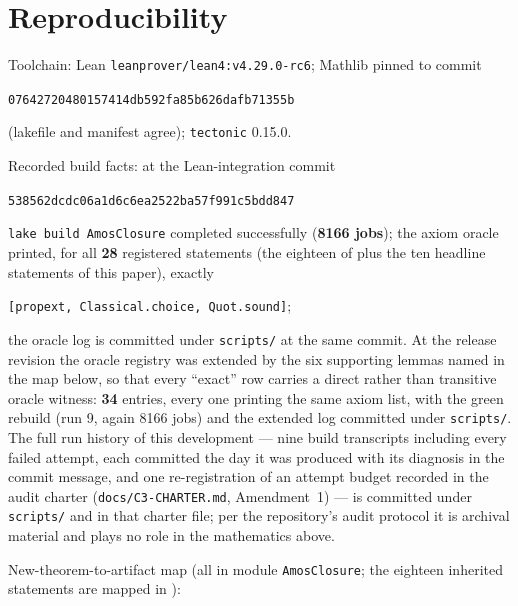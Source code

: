\documentclass[11pt]{article}
\newcommand{\lean}[1]{\texttt{#1}}
\begin{document}
\section{Reproducibility}\label{sec:repro}

Toolchain: Lean \lean{leanprover/lean4:v4.29.0-rc6}; Mathlib pinned
to commit
\begin{center}\small
\lean{07642720480157414db592fa85b626dafb71355b}
\end{center}
\noindent (lakefile and manifest agree); \lean{tectonic} 0.15.0.

\medskip
\noindent Recorded build facts: at the Lean-integration commit
\begin{center}\small
\lean{538562dcdc06a1d6c6ea2522ba57f991c5bdd847}
\end{center}
\noindent \lean{lake build AmosClosure} completed successfully
(\textbf{8166 jobs}); the axiom oracle printed, for all
\textbf{28} registered statements (the eighteen of \cite{ErikssonC2}
plus the ten headline statements of this paper), exactly
\begin{center}
\lean{[propext, Classical.choice, Quot.sound]};
\end{center}
\noindent the oracle log is committed under \lean{scripts/} at the
same commit.  At the release revision the oracle registry was
extended by the six supporting lemmas named in the map below, so
that every ``exact'' row carries a direct rather than transitive
oracle witness: \textbf{34} entries, every one printing the same
axiom list, with the green rebuild (run 9, again 8166 jobs) and the
extended log committed under \lean{scripts/}.
The full run history of this development --- nine build transcripts
including every failed attempt, each committed the day it was
produced with its diagnosis in the commit message, and one
re-registration of an attempt budget recorded in the audit charter
(\lean{docs/C3-CHARTER.md}, Amendment~1) --- is committed under
\lean{scripts/} and in that charter file; per the repository's
audit protocol it is archival material and plays no role in the
mathematics above.

\medskip
\noindent New-theorem-to-artifact map (all in module
\lean{AmosClosure}; the eighteen inherited statements are mapped in
\cite{ErikssonC2}):
\end{document}
